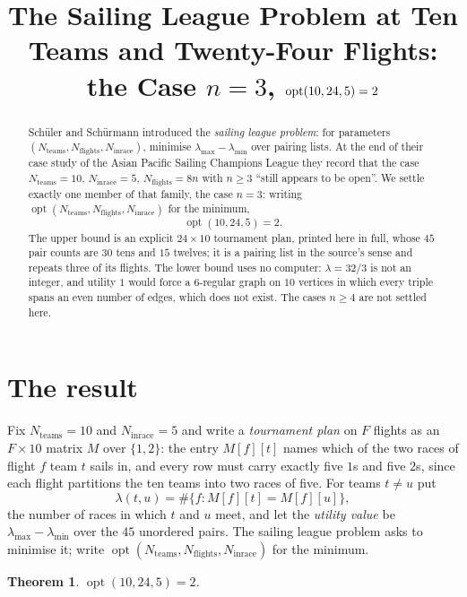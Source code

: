 \documentclass[11pt]{amsart}
\title[The sailing league problem at ten teams and twenty-four flights]
{The Sailing League Problem at Ten Teams and Twenty-Four Flights:
the Case $n=3$, $\opt(10,24,5)=2$}
\date{}
\newtheorem{theorem}{Theorem}
\theoremstyle{remark}
\newcommand{\opt}{\operatorname{opt}}
\begin{document}
\begin{abstract}
Sch\"uler and Sch\"urmann introduced the \emph{sailing league problem}: for
parameters $(N_{\mathrm{teams}},N_{\mathrm{flights}},N_{\mathrm{inrace}})$,
minimise $\lambda_{\max}-\lambda_{\min}$ over pairing lists. At the end of
their case study of the Asian Pacific Sailing Champions League they record that
the case $N_{\mathrm{teams}}=10$, $N_{\mathrm{inrace}}=5$,
$N_{\mathrm{flights}}=8n$ with $n\ge3$ ``still appears to be open''. We settle
exactly one member of that family, the case $n=3$: writing
$\opt(N_{\mathrm{teams}},N_{\mathrm{flights}},N_{\mathrm{inrace}})$ for the
minimum,
\[
  \opt(10,24,5)=2 .
\]
The upper bound is an explicit $24\times10$ tournament plan, printed here in
full, whose $45$ pair counts are $30$ tens and $15$ twelves; it is a pairing
list in the source's sense and repeats three of its flights. The lower bound
uses no computer: $\lambda=32/3$ is not an integer, and utility $1$ would force
a $6$-regular graph on $10$ vertices in which every triple spans an even number
of edges, which does not exist. The cases $n\ge4$ are not settled here.
\end{abstract}

\maketitle

\section{The result}\label{sec:result}

Fix $N_{\mathrm{teams}}=10$ and $N_{\mathrm{inrace}}=5$ and write a
\emph{tournament plan} on $F$ flights as an $F\times10$ matrix $M$ over
$\{1,2\}$: the entry $M[f][t]$ names which of the two races of flight $f$ team
$t$ sails in, and every row must carry exactly five $1$s and five $2$s, since
each flight partitions the ten teams into two races of five. For teams
$t\ne u$ put
\[
  \lambda(t,u)=\#\{f: M[f][t]=M[f][u]\},
\]
the number of races in which $t$ and $u$ meet, and let the \emph{utility value}
be $\lambda_{\max}-\lambda_{\min}$ over the $45$ unordered pairs. The sailing
league problem asks to minimise it; write
$\opt(N_{\mathrm{teams}},N_{\mathrm{flights}},N_{\mathrm{inrace}})$ for the
minimum.

\begin{theorem}\label{thm:main}
$\opt(10,24,5)=2$.
\end{theorem}
\end{document}
